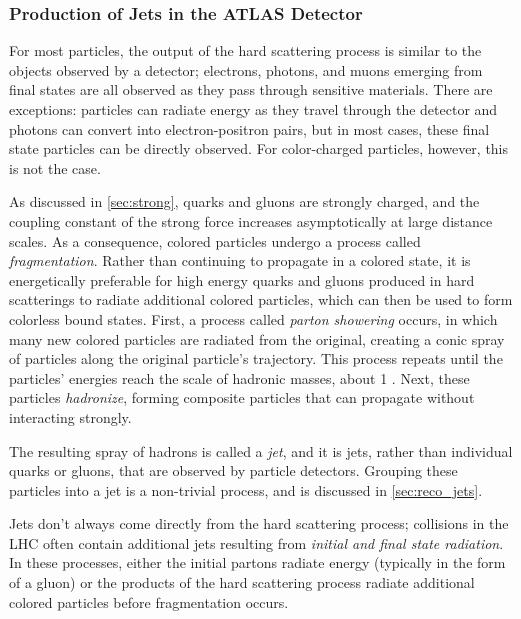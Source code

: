 \subsubsection{Production of Jets in the \ac{ATLAS} Detector}
\label{sec:pheno_jets}

For most particles, the output of the hard scattering process is similar to the objects observed by a detector; electrons, photons, and muons emerging from final states are all observed as they pass through sensitive materials. There are exceptions: particles can radiate energy as they travel through the detector and photons can convert into electron-positron pairs, but in most cases, these final state particles can be directly observed. For color-charged particles, however, this is not the case.

As discussed in \autoref{sec:strong}, quarks and gluons are strongly charged, and the coupling constant of the strong force increases asymptotically at large distance scales. As a consequence, colored particles undergo a process called \textit{fragmentation}. Rather than continuing to propagate in a colored state, it is energetically preferable for high energy quarks and gluons produced in hard scatterings to radiate additional colored particles, which can then be used to form colorless bound states. First, a process called \textit{parton showering} occurs, in which many new colored particles are radiated from the original, creating a conic spray of particles along the original particle's trajectory. This process repeats until the particles' energies reach the scale of hadronic masses, about 1 \gev. Next, these particles \textit{hadronize}, forming composite particles that can propagate without interacting strongly.     

The resulting spray of hadrons is called a \textit{jet}, and it is jets, rather than individual quarks or gluons, that are observed by particle detectors. Grouping these particles into a jet is a non-trivial process, and is discussed in \autoref{sec:reco_jets}.

Jets don't always come directly from the hard scattering process; collisions in the \ac{LHC} often contain additional jets resulting from \textit{initial and final state radiation}. In these processes, either the initial partons radiate energy (typically in the form of a gluon) or the products of the hard scattering process radiate additional colored particles before fragmentation occurs. 


